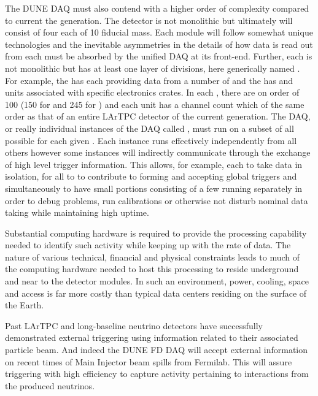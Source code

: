 The DUNE  DAQ must also contend with a higher order of
complexity compared to current the generation. 
The  detector is not monolithic but ultimately will consist
of four  each of \SI{10}{\kton} fiducial mass. 
Each module will follow somewhat unique technologies and the
inevitable asymmetries in the details of how data is read out from
each must be absorbed by the unified DAQ at its front-end. 
Further, each  is not monolithic but has at least one
layer of divisions, here generically named . 
For example, the   has  each
providing data from a number of  and the  has
 and  units associated with specific electronics
crates.
In each , there are on order of 100 
(150 for  and 245 for ) and each unit has a
channel count which of the same order as that of an entire LArTPC
detector of the current generation.
The DAQ, or really individual instances of the DAQ called
, must run on a subset of all possible
 for each given . 
Each instance runs effectively independently from all others however
some instances will indirectly communicate through the exchange of
high level trigger information. 
This allows, for example, each  to take data in
isolation, for all to  to contribute to forming and
accepting global  triggers and simultaneously to have small
portions consisting of a few  running separately in
order to debug problems, run calibrations or otherwise not disturb
nominal data taking while maintaining high uptime.

Substantial computing hardware is required to provide the processing
capability needed to identify such activity while keeping up with the
rate of data.
The nature of various technical, financial and physical constraints
leads to much of the computing hardware needed to host this processing
to reside underground and near to the detector modules. 
In such an environment, power, cooling, space and access is far more
costly than typical data centers residing on the surface of the Earth.

Past LArTPC and long-baseline neutrino detectors have successfully
demonstrated external triggering using information related to their
associated particle beam. 
And indeed the DUNE FD DAQ will accept external information on recent
times of Main Injector beam spills from Fermilab. 
This will assure triggering with high efficiency to capture activity
pertaining to interactions from the produced neutrinos. 

